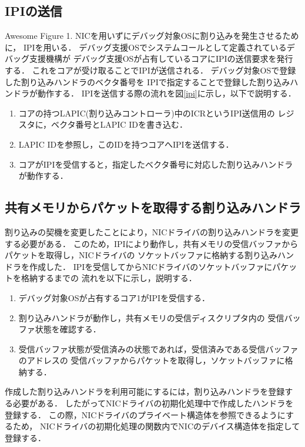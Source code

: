 \documentclass[tanilab-enum]{graduate}
\begin{document}
\subsection{IPIの送信}
{Awesome Figure 1.}
NICを用いずにデバッグ対象OSに割り込みを発生させるために，
IPIを用いる．
デバッグ支援OSでシステムコールとして定義されているデバッグ支援機構が
デバッグ支援OSが占有しているコアにIPIの送信要求を発行する．
これをコアが受け取ることでIPIが送信される．
デバッグ対象OSで登録した割り込みハンドラのベクタ番号を
IPIで指定することで登録した割り込みハンドラが動作する．
IPIを送信する際の流れを図\ref{ipi}に示し，以下で説明する．
\begin{enumerate}
    \item 
        コアの持つLAPIC(割り込みコントローラ)中のICRというIPI送信用の
        レジスタに，ベクタ番号とLAPIC IDを書き込む．
    \item 
        LAPIC IDを参照し，このIDを持つコアへIPIを送信する．
    \item 
        コアがIPIを受信すると，指定したベクタ番号に対応した割り込みハンドラが動作する．
\end{enumerate}
\subsection{共有メモリからパケットを取得する割り込みハンドラ}\label{handler}
割り込みの契機を変更したことにより，NICドライバの割り込みハンドラを変更する必要がある．
このため，IPIにより動作し，共有メモリの受信バッファからパケットを取得し，NICドライバの
ソケットバッファに格納する割り込みハンドラを作成した．
IPIを受信してからNICドライバのソケットバッファにパケットを格納するまでの
流れを以下に示し，説明する．
\begin{enumerate}
    \item 
        デバッグ対象OSが占有するコア1がIPIを受信する．
    \item 
        割り込みハンドラが動作し，共有メモリの受信ディスクリプタ内の
        受信バッファ状態を確認する．
    \item 
        受信バッファ状態が受信済みの状態であれば，受信済みである受信バッファのアドレスの
        受信バッファからパケットを取得し，ソケットバッファに格納する．
\end{enumerate}
作成した割り込みハンドラを利用可能にするには，割り込みハンドラを登録する必要がある．
したがってNICドライバの初期化処理中で作成したハンドラを登録する．
この際，NICドライバのプライベート構造体を参照できるようにするため，
NICドライバの初期化処理の関数内でNICのデバイス構造体を指定して登録する．
\end{document}
